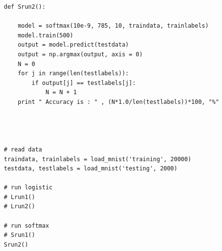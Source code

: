 \documentclass{article} %
\begin{document}
\begin{lstlisting}[frame=single]
def Srun2():

    model = softmax(10e-9, 785, 10, traindata, trainlabels)
    model.train(500)
    output = model.predict(testdata)
    output = np.argmax(output, axis = 0)
    N = 0
    for j in range(len(testlabels)):
        if output[j] == testlabels[j]:
            N = N + 1
    print " Accuracy is : " , (N*1.0/len(testlabels))*100, "%"
            
    
        

# read data
traindata, trainlabels = load_mnist('training', 20000)
testdata, testlabels = load_mnist('testing', 2000)

# run logistic
# Lrun1()
# Lrun2()

# run softmax
# Srun1()
Srun2()

\end{lstlisting}
\end{document}

